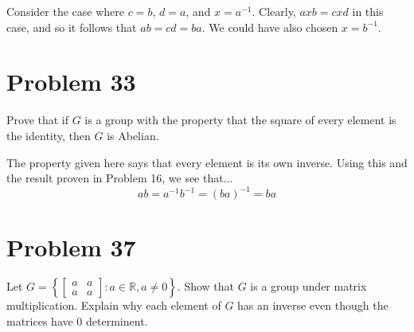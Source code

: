 \documentclass{article}
\begin{document}
Consider the case where $c=b$, $d=a$, and $x=a^{-1}$.  Clearly, $axb=cxd$ in this
case, and so it follows that $ab=cd=ba$.  We could have also chosen $x=b^{-1}$.

\section*{Problem 33}

Prove that if $G$ is a group with the property that the square of every element is the
identity, then $G$ is Abelian.

The property given here says that every element is its own inverse.
Using this and the result proven in Problem 16, we see that...
\begin{equation*}
ab = a^{-1}b^{-1} = (ba)^{-1} = ba
\end{equation*}

\section*{Problem 37}

Let $G=\left\{\left[\begin{array}{cc}a&a\\a&a\end{array}\right]:a\in\mathbb{R},a\neq 0\right\}$.
Show that $G$ is a group under matrix multiplication.  Explain why each element of $G$ has an
inverse even though the matrices have 0 determinent.
\end{document}
